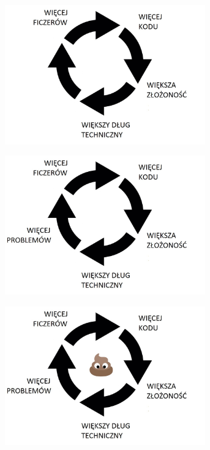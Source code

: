 \documentclass{beamer}
\begin{document}
\begin{frame}{}
\begin{center}
  	\includegraphics[height=6cm]{pgf5.jpg}
\end{center}
\end{frame}

\begin{frame}{}
\begin{center}
  	\includegraphics[height=6cm]{pgf6.jpg}
\end{center}
\end{frame}

\begin{frame}{}
\begin{center}
  	\includegraphics[height=6cm]{pgf7.jpg}
\end{center}
\end{frame}
\end{document}
